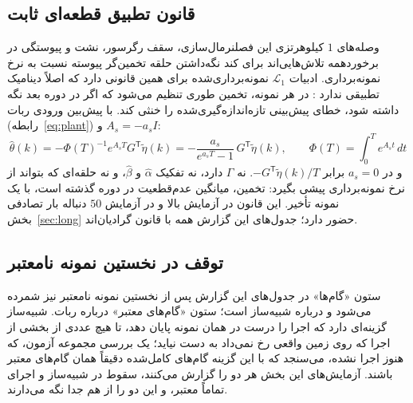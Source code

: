 \documentclass[10pt,twocolumn]{article}
\newcommand{\md}{\lr{\textemdash}}
\begin{document}
\subsection{قانون تطبیق قطعه‌ای ثابت}
\label{sec:pwc}
وصله‌های $1$ کیلوهرتزی این فصل\md{}نرمال‌سازی، سقف رگرسور، نشت و پیوستگی در برخورد\md{}همه
تلاش‌هایی‌اند برای کند نگه‌داشتن حلقه تخمین‌گر پیوسته نسبت به نرخ نمونه‌برداری. ادبیات
$\mathcal{L}_1$ نمونه‌برداری‌شده برای همین قانونی دارد که اصلاً دینامیک تطبیقی ندارد
\cite{hovakimyan2010l1}: در هر نمونه، تخمین طوری تنظیم می‌شود که اگر در دوره بعد نگه داشته
شود، خطای پیش‌بینی تازه‌اندازه‌گیری‌شده را خنثی کند. با پیش‌بین ورودی ربات
(رابطه~\eqref{eq:plant}) و $A_s=-a_sI$:
\begin{equation}
    \hat\theta(k)=-\Phi(T)^{-1}e^{A_sT}G^{\mathsf T}\tilde\eta(k)
    =-\frac{a_s}{e^{a_sT}-1}\,G^{\mathsf T}\tilde\eta(k),\qquad
    \Phi(T)=\int_0^T e^{A_st}\,dt
    \label{eq:pwc}
\end{equation}
و در $a_s=0$ برابر $-G^{\mathsf T}\tilde\eta(k)/T$. نه $\Gamma$ دارد، نه تفکیک $\hat\alpha$ و
$\hat\beta$، و نه حلقه‌ای که بتواند از نرخ نمونه‌برداری پیشی بگیرد: تخمین، میانگین عدم‌قطعیت
در دوره گذشته است، با یک نمونه تأخیر. این قانون در آزمایش بالا و در آزمایش $50$ دنباله بار
تصادفی بخش~\ref{sec:long} حضور دارد؛ جدول‌های این گزارش همه با قانون گرادیان‌اند.

\subsection{توقف در نخستین نمونه نامعتبر}
ستون «گام‌ها» در جدول‌های این گزارش پس از نخستین نمونه نامعتبر نیز شمرده می‌شود و درباره
شبیه‌ساز است؛ ستون «گام‌های معتبر» درباره ربات. شبیه‌ساز گزینه‌ای دارد که اجرا را درست در
همان نمونه پایان دهد، تا هیچ عددی از بخشی از اجرا که روی زمین واقعی رخ نمی‌داد به دست نیاید؛
یک بررسی مجموعه آزمون، که هنوز اجرا نشده، می‌سنجد که با این گزینه گام‌های کامل‌شده دقیقاً همان گام‌های معتبر باشند.
آزمایش‌های این بخش هر دو را گزارش می‌کنند، سقوط در شبیه‌ساز و اجرای تماماً معتبر، و این دو
را از هم جدا نگه می‌دارند.

\end{document}
